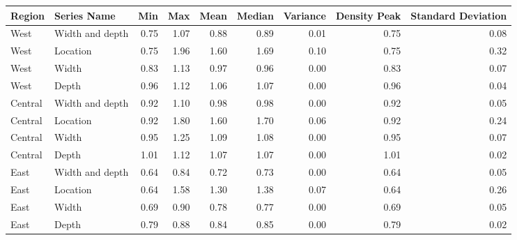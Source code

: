 \begin{tabular}{llrrrrrrr}
\toprule
 Region &     Series Name &  Min &  Max &  Mean &  Median &  Variance &  Density Peak &  Standard Deviation \\
\midrule
   West & Width and depth & 0.75 & 1.07 &  0.88 &    0.89 &      0.01 &          0.75 &                0.08 \\
   West &        Location & 0.75 & 1.96 &  1.60 &    1.69 &      0.10 &          0.75 &                0.32 \\
   West &           Width & 0.83 & 1.13 &  0.97 &    0.96 &      0.00 &          0.83 &                0.07 \\
   West &           Depth & 0.96 & 1.12 &  1.06 &    1.07 &      0.00 &          0.96 &                0.04 \\
Central & Width and depth & 0.92 & 1.10 &  0.98 &    0.98 &      0.00 &          0.92 &                0.05 \\
Central &        Location & 0.92 & 1.80 &  1.60 &    1.70 &      0.06 &          0.92 &                0.24 \\
Central &           Width & 0.95 & 1.25 &  1.09 &    1.08 &      0.00 &          0.95 &                0.07 \\
Central &           Depth & 1.01 & 1.12 &  1.07 &    1.07 &      0.00 &          1.01 &                0.02 \\
   East & Width and depth & 0.64 & 0.84 &  0.72 &    0.73 &      0.00 &          0.64 &                0.05 \\
   East &        Location & 0.64 & 1.58 &  1.30 &    1.38 &      0.07 &          0.64 &                0.26 \\
   East &           Width & 0.69 & 0.90 &  0.78 &    0.77 &      0.00 &          0.69 &                0.05 \\
   East &           Depth & 0.79 & 0.88 &  0.84 &    0.85 &      0.00 &          0.79 &                0.02 \\
\bottomrule
\end{tabular}
